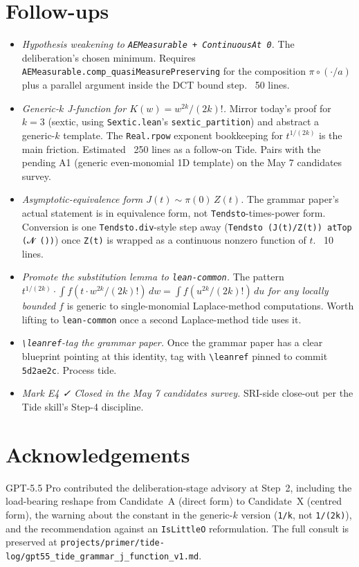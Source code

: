 \documentclass[11pt]{article}
\begin{document}
\section{Follow-ups}

\begin{itemize}[leftmargin=*]
\item \emph{Hypothesis weakening to \texttt{AEMeasurable + ContinuousAt 0}.}
The deliberation's chosen minimum. Requires \texttt{AEMeasurable.comp\_quasiMeasurePreserving}
for the composition $\pi \circ (\cdot/a)$ plus a parallel argument
inside the DCT bound step. ~50 lines.

\item \emph{Generic-$k$ J-function for $K(w) = w^{2k}/(2k)!$.}
Mirror today's proof for $k=3$ (sextic, using \texttt{Sextic.lean}'s
\texttt{sextic\_partition}) and abstract a generic-$k$ template.
The \texttt{Real.rpow} exponent bookkeeping for $t^{1/(2k)}$ is the
main friction. Estimated ~250 lines as a follow-on Tide. Pairs with
the pending A1 (generic even-monomial 1D template) on the May 7
candidates survey.

\item \emph{Asymptotic-equivalence form $J(t) \sim \pi(0)\, Z(t)$.}
The grammar paper's actual statement is in equivalence form, not
\texttt{Tendsto}-times-power form. Conversion is one
\texttt{Tendsto.div}-style step away (\texttt{Tendsto (J(t)/Z(t)) atTop (𝓝 ())})
once \texttt{Z(t)} is wrapped as a continuous nonzero function of
$t$. ~10 lines.

\item \emph{Promote the substitution lemma to \texttt{lean-common}.}
The pattern \emph{$t^{1/(2k)} \cdot \int f(t \cdot w^{2k}/(2k)!)\,dw =
\int f(u^{2k}/(2k)!)\,du$ for any locally bounded $f$} is generic to
single-monomial Laplace-method computations. Worth lifting to
\texttt{lean-common} once a second Laplace-method tide uses it.

\item \emph{\texttt{\textbackslash leanref}-tag the grammar paper.}
Once the grammar paper has a clear blueprint pointing at this
identity, tag with \texttt{\textbackslash leanref} pinned to commit
\texttt{5d2ae2c}. Process tide.

\item \emph{Mark E4 ✓ Closed in the May 7 candidates survey.}
SRI-side close-out per the Tide skill's Step-4 discipline.
\end{itemize}

\section*{Acknowledgements}

GPT-5.5 Pro contributed the deliberation-stage advisory at Step~2,
including the load-bearing reshape from Candidate~A (direct form)
to Candidate~X (centred form), the warning about the constant in
the generic-$k$ version (\texttt{1/k}, not \texttt{1/(2k)}), and the
recommendation against an \texttt{IsLittleO} reformulation. The full
consult is preserved at
\texttt{projects/primer/tide-log/gpt55\_tide\_grammar\_j\_function\_v1.md}.
\end{document}
